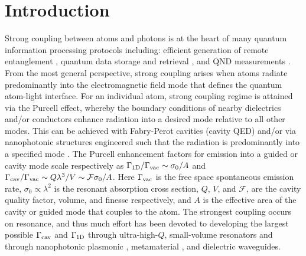 \documentclass[aps,pra,twocolumn]{revtex4-1} %
\newcommand{\oneD}{{\rm 1D}}
\newcommand{\vac}{{\rm vac}}
\newcommand{\cav}{{\rm cav}}
\begin{document}
\maketitle

\section{Introduction}

Strong coupling between atoms and photons is at the heart of many quantum information processing protocols including: efficient generation of remote entanglement \cite{duan_long-distance_2001, julsgaard_experimental_2001}, quantum data storage and retrieval \cite{ eisaman_electromagnetically_2005}, and QND measurements \cite{eckert_quantum_2008}.  
From the most general perspective, strong coupling arises when atoms radiate predominantly into the electromagnetic field mode that defines the quantum atom-light interface.  
For an individual atom, strong coupling regime is attained via the Purcell effect, whereby the boundary conditions of nearby dielectrics and/or conductors enhance radiation into a desired mode relative to all other modes.  
This can be achieved with Fabry-Perot cavities (cavity QED) \cite{miller_trapped_2005} and/or via nanophotonic structures engineered such that the radiation is predominantly into a specified mode \cite{manga_rao_single_2007, hakuta_manipulating_2012, hung_trapped_2013}.  
The Purcell enhancement factors for emission into a guided or cavity mode scale respectively as  $ \Gamma_{\oneD}/\Gamma_{\vac} \sim \sigma_0/A$ and  
$\Gamma_{\cav}/\Gamma_{\vac} \sim   Q \lambda^3/V \sim \mathcal{F}  \sigma_0/A$.  
Here $\Gamma_{\vac}$ is the free space spontaneous emission rate, $\sigma_0 \propto \lambda^2$ is the resonant absorption cross section, $Q$, $V$, and $\mathcal{F}$,  are the cavity quality factor, volume, and finesse respectively, and $A$ is the effective area of the cavity or guided mode that couples to the atom.  
The strongest coupling occurs on resonance, and thus much effort has been devoted to developing the largest possible $\Gamma_{\cav}$ and $\Gamma_{\oneD}$ through ultra-high-$Q$, small-volume resonators \cite{raimond_manipulating_2001, wallraff_strong_2004, miller_trapped_2005} and through nanophotonic plasmonic \cite{dzsotjan_quantum_2010, tame_quantum_2013}, metamaterial \cite{yao_ultrahigh_2009}, and dielectric \cite{hung_trapped_2013, goban_atomlight_2014} waveguides.   
\end{document}
